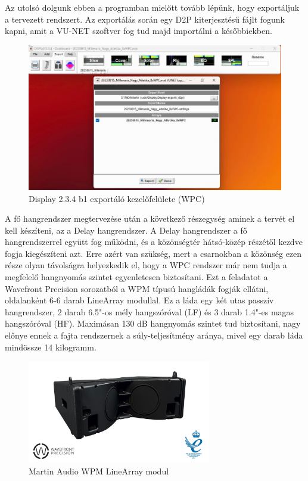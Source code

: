 Az utolsó dolgunk ebben a programban mielőtt tovább lépünk, hogy exportáljuk a tervezett rendszert.
Az exportálás során egy D2P kiterjesztésű fájlt fogunk kapni, amit a VU-NET szoftver fog tud majd importálni a későbbiekben.
\begin{figure}[H]
	\centering
	\includegraphics[width=\textwidth, keepaspectratio]{figures/display_wpc_7.jpg}
	\caption{Display 2.3.4 b1 exportáló kezelőfelülete (WPC)}\label{fig:display_wpc_7}
\end{figure}
A fő hangrendszer megtervezése után a következő részegység aminek a tervét el kell készíteni, az a Delay hangrendszer.
A Delay hangrendszer a fő hangrendszerrel együtt fog működni, és a közönségtér hátsó-közép részétől kezdve fogja kiegészíteni azt.
Erre azért van szükség, mert a csarnokban a közönség ezen része olyan távolságra helyezkedik el, hogy
a WPC rendszer már nem tudja a megfelelő hangnyomás szintet egyenletesen biztosítani.
Ezt a feladatot a Wavefront Precision sorozatból a WPM típusú hangládák fogják ellátni, oldalanként 6-6 darab LineArray modullal.
Ez a láda egy két utas passzív hangrendszer, 2 darab 6.5"-os mély hangszóróval (LF) és 3 darab 1.4"-es magas hangszóróval (HF). 
Maximásan 130 dB hangnyomás szintet tud biztosítani, nagy előnye ennek a fajta rendszernek a súly-teljesítmény aránya, mivel egy
darab láda mindössze 14 kilogramm.~\cite{WPMUSERGUIDE}
\begin{figure}[H]
	\centering
	\includegraphics[width=80mm, keepaspectratio]{figures/wpm_front_view.jpg}
	\caption{Martin Audio WPM LineArray modul}\label{fig:wpm}
\end{figure}

